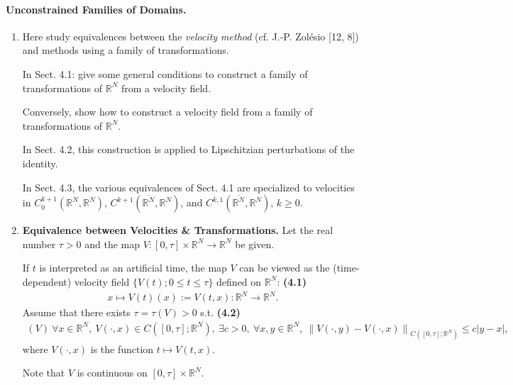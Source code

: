 \documentclass{book}
\numberwithin{equation}{section}
\begin{document}
\paragraph{Unconstrained Families of Domains.}
\begin{enumerate}
    \item Here study equivalences between the \textit{velocity method} (cf. J.-P. Zolésio [12, 8]) and methods using a family of transformations.
    
    In Sect. 4.1: give some general conditions to construct a family of transformations of $\mathbb{R}^N$ from a velocity field.
    
    Conversely, show how to construct a velocity field from a family of transformations of $\mathbb{R}^N$.
    
    In Sect. 4.2, this construction is applied to Lipschitzian perturbations of the identity.
    
    In Sect. 4.3, the various equivalences of Sect. 4.1 are specialized to velocities in $C_0^{k+1}(\mathbb{R}^N,\mathbb{R}^N)$, $C^{k+1}(\overline{\mathbb{R}^N},\mathbb{R}^N)$, and $C^{k,1}(\overline{\mathbb{R}^N},\mathbb{R}^N)$, $k\ge 0$.
    \item \textbf{Equivalence between Velocities \& Transformations.} Let the real number $\tau > 0$ and the map $V:[0,\tau]\times\mathbb{R}^N\to\mathbb{R}^N$ be given.
    
    If $t$ is interpreted as an artificial time, the map $V$ can be viewed as the (time-dependent) velocity field $\{V(t);0\le t\le\tau\}$ defined on $\mathbb{R}^N$: \textbf{(4.1)}
    \begin{align*}
        x\mapsto V(t)(x) := V(t,x):\mathbb{R}^N\to\mathbb{R}^N.
    \end{align*}
    Assume that there exists $\tau = \tau(V) > 0$ s.t. \textbf{(4.2)}
    \begin{align*}
        (V)\ \forall x\in\mathbb{R}^N,\ V(\cdot,x)\in C\left([0,\tau];\mathbb{R}^N\right),\ \exists c > 0,\ \forall x,y\in\mathbb{R}^N,\ \left\|V(\cdot,y) - V(\cdot,x)\right\|_{C\left([0,\tau];\mathbb{R}^N\right)}\le c\left|y - x\right|,
    \end{align*}
    where $V(\cdot,x)$ is the function $t\mapsto V(t,x)$.
    
    Note that $V$ is continuous on $[0,\tau]\times\mathbb{R}^N$.
    

\end{enumerate}
\end{document}
